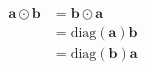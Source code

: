 \begin{equation}
\begin{aligned}
\mathbf{a} \odot \mathbf{b} &= \mathbf{b} \odot \mathbf{a} \\
&= \text{diag} \left( \mathbf{a} \right) \mathbf{b} \\
&= \text{diag} \left( \mathbf{b} \right) \mathbf{a}
\end{aligned}
\end{equation}
